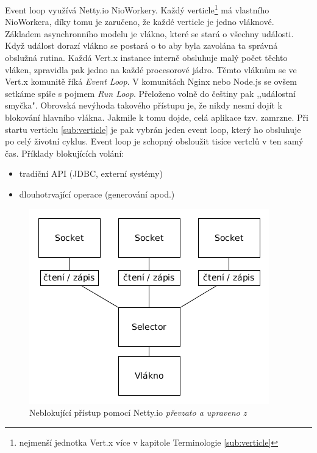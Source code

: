Event loop využívá Netty.io NioWorkery. Každý verticle\footnote{nejmenší jednotka Vert.x více v kapitole Terminologie \ref{sub:verticle}} má vlastního NioWorkera, díky tomu je zaručeno, že každé verticle je jedno vláknové. Základem asynchronního modelu je vlákno, které se stará o všechny události. Když událost dorazí vlákno se postará o to aby byla zavolána ta správná obslužná rutina. Každá Vert.x instance interně obsluhuje malý počet těchto vláken, zpravidla pak jedno na každé procesorové jádro. Těmto vláknům se ve Vert.x komunitě říká \emph{Event Loop}. V komunitách Nginx nebo Node.js se ovšem setkáme spíše s pojmem \emph{Run Loop}. Přeloženo volně do češtiny pak ,,událostní smyčka". Obrovská nevýhoda takového přístupu je, že nikdy nesmí dojít k blokování hlavního vlákna. Jakmile k tomu dojde, celá aplikace tzv. zamrzne. Při startu verticlu \ref{sub:verticle} je pak vybrán jeden event loop, který ho obsluhuje po celý životní cyklus. Event loop je schopný obsloužit tisíce vertclů v ten samý čas. Příklady blokujících volání:
\begin{itemize}
\item{tradiční API (JDBC, externí systémy)}
\item{dlouhotrvající operace (generování apod.)}
\end{itemize}

\begin{figure}
\begin{centering}
\includegraphics[scale=0.55]{obrazky/vertx_pattern}
\par\end{centering}
\caption{Neblokující přístup pomocí Netty.io \emph{převzato a upraveno z \cite{nettyInAction}}\label{fig:vertx_pattern}}
\end{figure}

